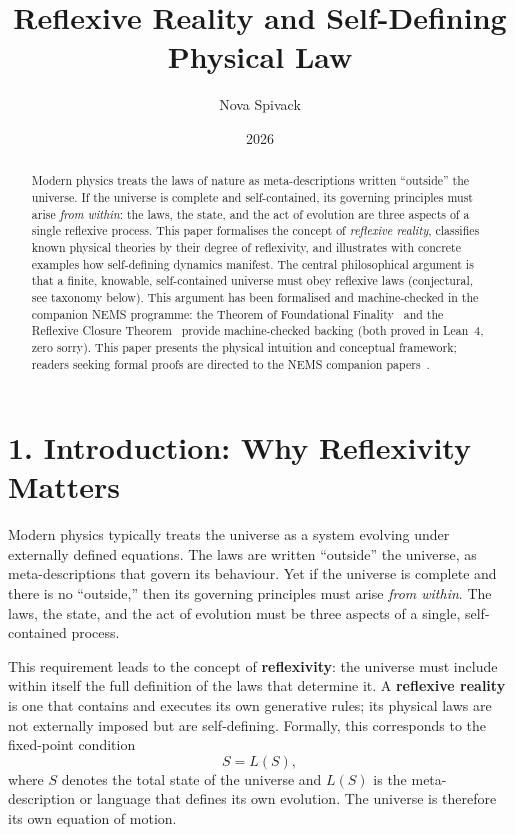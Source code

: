 \documentclass[11pt]{article}
\begin{document}
\title{\textbf{Reflexive Reality and Self-Defining Physical Law}}
\author{Nova Spivack}
\date{2026}
\maketitle
\NovaZenodoAfterTitle

\begin{abstract}
Modern physics treats the laws of nature as meta-descriptions written
``outside'' the universe. If the universe is complete and self-contained,
its governing principles must arise \emph{from within}: the laws, the
state, and the act of evolution are three aspects of a single reflexive
process. This paper formalises the concept of \emph{reflexive reality},
classifies known physical theories by their degree of reflexivity, and
illustrates with concrete examples how self-defining dynamics manifest.
The central philosophical argument is that a finite, knowable,
self-contained universe must obey reflexive laws (conjectural, see taxonomy below). This
argument has been formalised and machine-checked in the companion NEMS
programme: the Theorem of Foundational Finality~\cite{SpivackNEMS23}
and the Reflexive Closure Theorem~\cite{SpivackNEMS56} provide
machine-checked backing (both proved in Lean~4, zero sorry). This paper presents the physical intuition
and conceptual framework; readers seeking formal proofs are directed
to the NEMS companion papers~\cite{SpivackNEMSHub}.
\end{abstract}

\tableofcontents

\section*{1. Introduction: Why Reflexivity Matters}

Modern physics typically treats the universe as a system evolving under
externally defined equations.
The laws are written ``outside'' the universe, as meta-descriptions
that govern its behaviour.
Yet if the universe is complete and there is no ``outside,'' then its
governing principles must arise \emph{from within}.
The laws, the state, and the act of evolution must be three aspects of
a single, self-contained process.

This requirement leads to the concept of \textbf{reflexivity}: the
universe must include within itself the full definition of the laws that
determine it.
A \textbf{reflexive reality} is one that contains and executes its own
generative rules; its physical laws are not externally imposed but are
self-defining.
Formally, this corresponds to the fixed-point condition
\[
S = L(S),
\]
where \(S\) denotes the total state of the universe and \(L(S)\) is
the meta-description or language that defines its own evolution.
The universe is therefore its own equation of motion.
\end{document}
